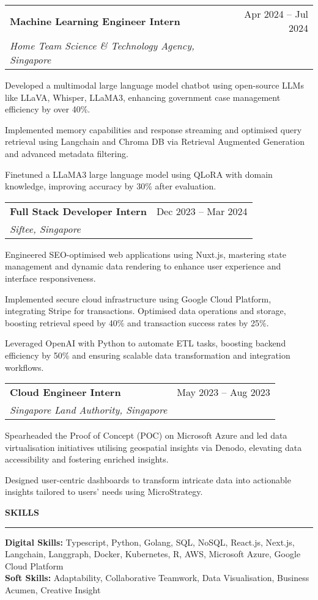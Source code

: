 \documentclass[11pt,letterpaper]{article}
\makeatletter
\newcommand{\resheading}[1]{%
  \vspace{2pt}
  {\normalsize \textbf{\MakeUppercase{#1}}}\\
  \vspace{-8pt}
  \hrule
}
\newcommand{\resitem}[1]{\item \small #1 \vspace{-2pt}}
\newcommand{\ressubheading}[4]{
    \vspace{2pt}
    \begin{tabular*}{\textwidth}{l@{\extracolsep{\fill}}r}
        \small \textbf{#1} & \small #2 \\
        \small \textit{#3} & \small \textit{#4} \\
    \end{tabular*}\vspace{-3pt}}
\makeatother
\begin{document}
\begin{leftitemize}
\item[]
\ressubheading{Machine Learning Engineer Intern}{Apr 2024 -- Jul 2024}{Home Team Science \& Technology Agency, Singapore}{}
\begin{subitemize}
    \resitem{Developed a multimodal large language model chatbot using open-source LLMs like LLaVA, Whisper, LLaMA3, enhancing government case management efficiency by over 40\%.}
    \resitem{Implemented memory capabilities and response streaming and optimised query retrieval using Langchain and Chroma DB via Retrieval Augmented Generation and advanced metadata filtering.}
    \resitem{Finetuned a LLaMA3 large language model using QLoRA with domain knowledge, improving accuracy by 30\% after evaluation.}
\end{subitemize}

\item[]
\ressubheading{Full Stack Developer Intern}{Dec 2023 -- Mar 2024}{Siftee, Singapore}{}
\begin{subitemize}
    \resitem{Engineered SEO-optimised web applications using Nuxt.js, mastering state management and dynamic data rendering to enhance user experience and interface responsiveness.}
    \resitem{Implemented secure cloud infrastructure using Google Cloud Platform, integrating Stripe for transactions. Optimised data operations and storage, boosting retrieval speed by 40\% and transaction success rates by 25\%.}
    \resitem{Leveraged OpenAI with Python to automate ETL tasks, boosting backend efficiency by 50\% and ensuring scalable data transformation and integration workflows.}
\end{subitemize}

\item[]
\ressubheading{Cloud Engineer Intern}{May 2023 -- Aug 2023}{Singapore Land Authority, Singapore}{}
\begin{subitemize}
    \resitem{Spearheaded the Proof of Concept (POC) on Microsoft Azure and led data virtualisation initiatives utilising geospatial insights via Denodo, elevating data accessibility and fostering enriched insights.}
    \resitem{Designed user-centric dashboards to transform intricate data into actionable insights tailored to users' needs using MicroStrategy.}
\end{subitemize}
\end{leftitemize}

\resheading{Skills}
\begin{leftitemize}
\item[]
\small \textbf{Digital Skills:} Typescript, Python, Golang, SQL, NoSQL, React.js, Next.js, Langchain, Langgraph, Docker, Kubernetes, R, AWS, Microsoft Azure, Google Cloud Platform\\[4pt]
\small \textbf{Soft Skills:} Adaptability, Collaborative Teamwork, Data Visualisation, Business Acumen, Creative Insight
\end{leftitemize}
\end{document}
